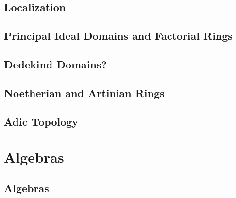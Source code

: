 	\subsection{Localization}
	\subsection{Principal Ideal Domains and Factorial Rings}
	\subsection{Dedekind Domains?}
	\subsection{Noetherian and Artinian Rings}
	\subsection{Adic Topology}
	\section{Algebras}
	\subsection{Algebras}
